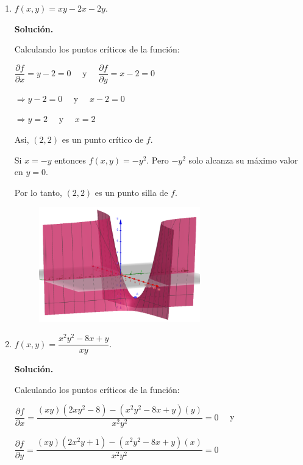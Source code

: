 \documentclass[fleqn, 12pt]{article}
\newcommand{\derivadaparcial}[2]{\dfrac{\partial {#1}}{\partial {#2}}}
\begin{document}
\begin{enumerate}
\begin{enumerate}
            \item $ f(x,y) = xy - 2x - 2y $.
            
            \textbf{Solución.}

            Calculando los puntos críticos de la función:

            $ \derivadaparcial{f}{x} = y - 2 = 0 \quad $ y $ \quad \derivadaparcial{f}{y} = x - 2 = 0 $

            $ \Longrightarrow y - 2 = 0 \quad $ y $ \quad x - 2 = 0 $

            $ \Longrightarrow y = 2 \quad $ y $ \quad x = 2 $

            Asi, $ (2,2) $ es un punto crítico de $ f $.

            Si $ x = -y $ entonces $ f(x,y) = -y^2 $. Pero $ -y^2 $ solo alcanza su máximo valor en $ y = 0 $.

            Por lo tanto, $ (2,2) $ es un punto silla de $ f $.

            \begin{figure}[h]
                \centering
                \includegraphics[height = 5cm]{Segundo.png}
            \end{figure}

            \item $ f(x,y) = \dfrac{x^2 y^2 - 8x + y}{xy} $.
            
            \textbf{Solución.}

            Calculando los puntos críticos de la función:

            $ \derivadaparcial{f}{x} = \dfrac{(xy)(2x y^2 - 8) - (x^2 y^2 - 8x + y)(y)}{x^2 y^2} = 0 \quad $ y

            $ \derivadaparcial{f}{y} = \dfrac{(xy)(2x^2 y + 1) - (x^2 y^2 - 8x + y)(x)}{x^2 y^2} = 0 $



\end{enumerate}
\end{enumerate}
\end{document}
